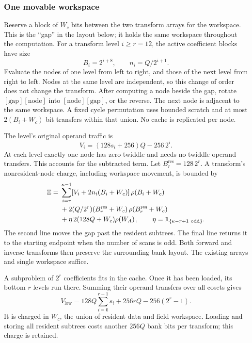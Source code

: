 \documentclass[b5paper, 10pt, abstract=true, captions=tableheading]{scrartcl}
\theoremstyle{plain}
\theoremstyle{definition}
\begin{document}
\subsubsection{One movable workspace}
Reserve a block of $W_c$ bits between the two transform arrays for the
workspace. This is the ``gap'' in the layout below; it holds the same
workspace throughout the computation. For a transform level \(i\ge r=12\), the active
coefficient blocks have size
\[
 B_i=2^{i+8},\qquad n_i=Q/2^{i+1}.
\]
Evaluate the nodes of one level from left to right, and those of the
next level from right to left. Nodes at the same level are independent,
so this change of order does not change the transform. After computing a node beside the gap,
rotate \([\text{gap}][\text{node}]\) into
\([\text{node}][\text{gap}]\), or the reverse. The next node is adjacent
to the same workspace. A fixed cycle permutation uses bounded scratch
and at most \(2(B_i+W_c)\) bit transfers within that union. No cache is
replicated per node.

The level's original operand traffic is
\begin{equation}
 V_i=(128s_i+256)Q-256\,2^i.
 \label{eq:wopt-leveltraffic}
\end{equation}
At each level exactly one node has zero twiddle and needs no twiddle
operand transfers. This accounts for the subtracted term. Let
\(B_r^{\mathrm{res}}=128\,2^r\). A transform's nonresident-node charge,
including workspace movement, is bounded by
\begin{equation}
 \begin{split}
 \Xi={}&\sum_{i=r}^{\kappa-1}
       [V_i+2n_i(B_i+W_c)]\,\rho\!\left(B_i+W_c\right)\\
 &+2(Q/2^r)(B_r^{\mathrm{res}}+W_c)\,
                      \rho\!\left(B_r^{\mathrm{res}}+W_c\right)\\
 &+\eta\,2(128Q+W_c)\rho\!\left(W_A\right),
 \qquad
 \eta=\mathbf1_{\{\kappa-r+1\ {\mathrm{odd}}\}} .
 \end{split}
 \label{eq:wopt-xi}
\end{equation}
The second line moves the gap past the resident subtrees. The final
line returns it to the starting endpoint when the number of scans is
odd. Both forward and inverse transforms then preserve the surrounding
bank layout. The existing arrays and single workspace suffice.

A subproblem of $2^r$ coefficients fits in the cache. Once it has been
loaded, its bottom $r$ levels run there. Summing their operand transfers
over all cosets gives
\[
 V_{\mathrm{low}}
 =128Q\sum_{i=0}^{r-1}s_i+256rQ-256(2^r-1).
\]
It is charged in \(W_c\), the union of resident data and field workspace.
Loading and storing all resident subtrees costs another \(256Q\) bank
bits per transform; this charge is retained.
\end{document}
